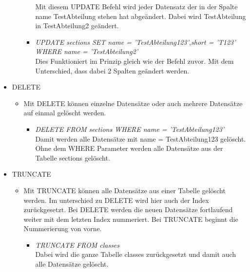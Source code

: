 \begin{itemize}
\begin{itemize}
\begin{itemize}
					Mit diesem UPDATE Befehl wird jeder Datensatz der in der Spalte name TestAbteilung stehen hat abgeändert. Dabei wird TestAbteilung in TestAbteilung2 geändert.
				\item \textit{UPDATE sections SET name = 'TestAbteilung123',short = 'T123' WHERE name = 'TestAbteilung2'}\\
					Dies Funktioniert im Prinzip gleich wie der Befehl zuvor. Mit dem Unterschied, dass dabei 2 Spalten geändert werden.
			\end{itemize}
		\end{itemize}
	\item DELETE
		\begin{itemize}
			\item Mit DELETE können einzelne Datensätze oder auch mehrere Datensätze auf einmal gelöscht werden.
			\begin{itemize}
				\item \textit{DELETE FROM sections WHERE name = 'TestAbteilung123'}\\
					Damit werden alle Datensätze mit name = TestAbteilung123 gelöscht. Ohne dem WHERE Parameter werden alle Datensätze aus der Tabelle sections gelöscht.
			\end{itemize}
		\end{itemize}
	\item TRUNCATE
		\begin{itemize}
			\item Mit TRUNCATE können alle Datensätze aus einer Tabelle gelöscht werden. Im unterschied zu DELETE wird hier auch der Index zurückgesetzt. Bei DELETE werden die neuen Datensätze fortlaufend weiter mit dem letzten Index nummeriert. Bei TRUNCATE beginnt die Nummerierung von vorne.
			\begin{itemize}
				\item \textit{TRUNCATE FROM classes}\\
					Dabei wird die ganze Tabelle classes zurückgesetzt und damit auch alle Datensätze gelöscht. 
			\end{itemize} 
			
		\end{itemize}
\end{itemize}

